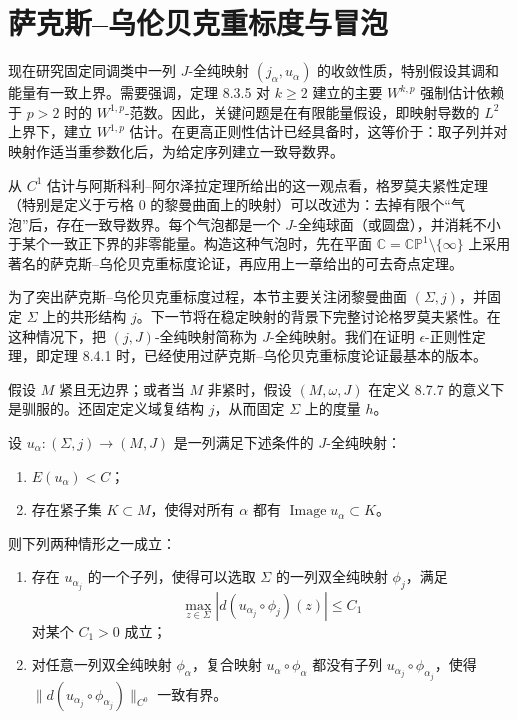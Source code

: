\section{萨克斯--乌伦贝克重标度与冒泡}
\label{sec:sacks-uhlenbeck-rescaling-bubbling}

现在研究固定同调类中一列 $J$-全纯映射 $(j_\alpha,u_\alpha)$ 的收敛性质，特别假设其调和能量有一致上界。需要强调，定理 8.3.5 对 $k\geq2$ 建立的主要 $W^{k,p}$ 强制估计依赖于 $p>2$ 时的 $W^{1,p}$-范数。因此，关键问题是在有限能量假设，即映射导数的 $L^2$ 上界下，建立 $W^{1,p}$ 估计。在更高正则性估计已经具备时，这等价于：取子列并对映射作适当重参数化后，为给定序列建立一致导数界。

从 $C^1$ 估计与阿斯科利--阿尔泽拉定理所给出的这一观点看，格罗莫夫紧性定理（特别是定义于亏格 $0$ 的黎曼曲面上的映射）可以改述为：去掉有限个“气泡”后，存在一致导数界。每个气泡都是一个 $J$-全纯球面（或圆盘），并消耗不小于某个一致正下界的非零能量。构造这种气泡时，先在平面
$\mathbb C=\mathbb{CP}^1\setminus\{\infty\}$ 上采用著名的萨克斯--乌伦贝克重标度论证，再应用上一章给出的可去奇点定理。

为了突出萨克斯--乌伦贝克重标度过程，本节主要关注闭黎曼曲面 $(\Sigma,j)$，并固定 $\Sigma$ 上的共形结构 $j$。下一节将在稳定映射的背景下完整讨论格罗莫夫紧性。在这种情况下，把 $(j,J)$-全纯映射简称为 $J$-全纯映射。我们在证明 $\epsilon$-正则性定理，即定理 8.4.1 时，已经使用过萨克斯--乌伦贝克重标度论证最基本的版本。

假设 $M$ 紧且无边界；或者当 $M$ 非紧时，假设 $(M,\omega,J)$ 在定义 8.7.7 的意义下是驯服的。还固定定义域复结构 $j$，从而固定 $\Sigma$ 上的度量 $h$。

设 $u_\alpha:(\Sigma,j)\to(M,J)$ 是一列满足下述条件的 $J$-全纯映射：
\begin{enumerate}[label=(\arabic*)]
 \item $E(u_\alpha)<C$；
 \item 存在紧子集 $K\subset M$，使得对所有 $\alpha$ 都有
 $\operatorname{Image}u_\alpha\subset K$。
\end{enumerate}
则下列两种情形之一成立：
\begin{enumerate}[label=(\arabic*)]
 \item 存在 $u_{\alpha_j}$ 的一个子列，使得可以选取 $\Sigma$ 的一列双全纯映射 $\phi_j$，满足
 \[
  \max_{z\in\Sigma}|d(u_{\alpha_j}\circ\phi_j)(z)|\leq C_1
 \]
 对某个 $C_1>0$ 成立；
 \item 对任意一列双全纯映射 $\phi_\alpha$，复合映射
 $u_\alpha\circ\phi_\alpha$ 都没有子列
 $u_{\alpha_j}\circ\phi_{\alpha_j}$，使得
 $\|d(u_{\alpha_j}\circ\phi_{\alpha_j})\|_{C^0}$ 一致有界。
\end{enumerate}

